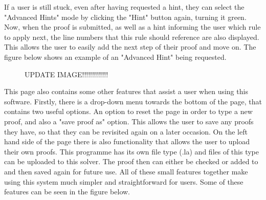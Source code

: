 If a user is still stuck, even after having requested a hint, they can select the "Advanced Hints" mode by clicking the "Hint" button again, turning it green. Now, when the proof is submitted, as well as a hint informing the user which rule to apply next, the line numbers that this rule should reference are also displayed. This allows the user to easily add the next step of their proof and move on. The figure below shows an example of an "Advanced Hint" being requested.

\begin{figure}[!ht]
	\centering
	\caption{UPDATE IMAGE!!!!!!!!!!!!!}
\end{figure}

This page also contains some other features that assist a user when using this software. Firstly, there is a drop-down menu towards the bottom of the page, that contains two useful options. An option to reset the page in order to type a new proof, and also a "save proof as" option. This allows the user to save any proofs they have, so that they can be revisited again on a later occasion. On the left hand side of the page there is also functionality that allows the user to upload their own proofs. This programme has its own file type (.la) and files of this type can be uploaded to this solver. The proof then can either be checked or added to and then saved again for future use. All of these small features together make using this system much simpler and straightforward for users. Some of these features can be seen in the figure below.

